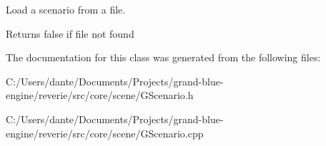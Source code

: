 Load a scenario from a file. 

Returns false if file not found 

The documentation for this class was generated from the following files\+:\begin{DoxyCompactItemize}
\item 
C\+:/\+Users/dante/\+Documents/\+Projects/grand-\/blue-\/engine/reverie/src/core/scene/G\+Scenario.\+h\item 
C\+:/\+Users/dante/\+Documents/\+Projects/grand-\/blue-\/engine/reverie/src/core/scene/G\+Scenario.\+cpp\end{DoxyCompactItemize}
